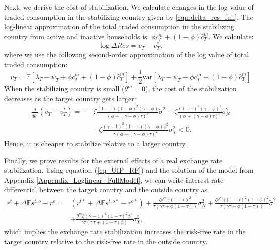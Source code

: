 Next, we derive the cost of stabilization. We calculate changes in the
log value of traded consumption in the stabilizing country given by
\eqref{eqn:delta_res_full}. The log-linear approximation of the total
traded consumption in the stabilizing country from active and inactive
households is: $\phi c_T^{m} + (1 - \phi) \hat{c}_T^m$. We calculate:
\begin{equation*}
  \log \Delta Res = v_T - v^\ast_T,
\end{equation*}
where we use the following second-order approximation of the log value
of total traded consumption:
\begin{equation*}
  v_T = \mathbb{E}\left[ \lambda_T - \psi_T + \phi c_T^{m} + (1 - \phi) \hat{c}_T^m  \right]
  + \frac{1}{2} \text{var}\left[ \lambda_T - \psi_T + \phi c_T^{m} + (1 - \phi) \hat{c}_T^m \right]
\end{equation*}
When the stabilizing country is small ($\theta^m = 0$), the cost of
the stabilization decreases as the target country gets larger:
\begin{align*}
  \frac{d}{d \theta^t}\left( v_T - v_T^{\ast} \right) = -
  & \zeta \frac{(1 - \tau)(1 - \phi)^2 (\gamma - \phi)}{\left( \phi + (\gamma - \phi) \tau\right)^2 }\tilde{\sigma}^2 
    - \zeta \frac{(1 - \tau)^2 (\gamma - \phi)^2}{\left(\phi + (\gamma - \phi) \tau\right)^2} \sigma_N^2 \\  
  & - \zeta \frac{(\gamma - 1)^2 (1 - \tau)(\gamma - \phi) \phi^2}{\gamma \left( \phi + (\gamma - \phi) \tau \right)^2} \sigma_{\chi}^2 < 0.
\end{align*}
Hence, it is cheaper to stabilize relative to a larger country.

Finally, we prove results for the external effects of a real exchange
rate stabilization. Using equation (\ref{eq_UIP_RF}) and the solution
of the model from Appendix \ref{Appendix_Loglinear_FullModel}, we can
write interest rate differential between the target country and the
outside country as
\begin{align*}
  r^t + \Delta \mathbb{E}s^{t, o} - r^o =
  & \left(r^{t \ast} + \Delta \mathbb{E}s^{t, o \ast} - r^{o \ast} \right) + 
    \frac{\zeta \theta^m \gamma (1 - \tau)^2 }{\tau \left( \gamma \tau + \phi (1 - \tau) \right)} \sigma_N^2 
    + \frac{\zeta \theta^m \gamma (1 - \tau)^2 (1 - \phi)^2}{\tau \left( \gamma \tau + \phi (1 - \tau) \right)} \tilde{\sigma}^2 \\
  & + \frac{\theta^m \zeta (\gamma - 1)^2 (1 - \tau)^2 \phi^2}{\gamma \tau \left( \gamma \tau + (1 - \tau) \phi \right)}\sigma_\chi^2,
\end{align*}
which implies the exchange rate stabilization increases the risk-free
rate in the target country relative to the risk-free rate in the
outside country.

